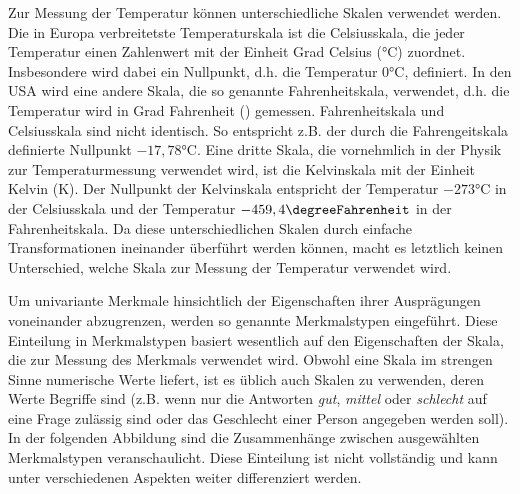 \documentclass{lecture}
\begin{document}
    \begin{example}
        Zur Messung der Temperatur können unterschiedliche Skalen verwendet werden.
        Die in Europa verbreitetste Temperaturskala ist die Celsiusskala, die jeder Temperatur einen Zahlenwert mit der Einheit Grad Celsius (\si{\degreeCelsius}) zuordnet.
        Insbesondere wird dabei ein Nullpunkt, d.h. die Temperatur \(0\si{\degreeCelsius}\), definiert.
        In den USA wird eine andere Skala, die so genannte Fahrenheitskala, verwendet, d.h. die Temperatur wird in Grad Fahrenheit (\si{\degreeFahrenheit}) gemessen.
        Fahrenheitskala und Celsiusskala sind nicht identisch.
        So entspricht z.B. der durch die Fahrengeitskala definierte Nullpunkt \(-17,78\si{\degreeCelsius}\).
        Eine dritte Skala, die vornehmlich in der Physik zur Temperaturmessung verwendet wird, ist die Kelvinskala mit der Einheit Kelvin (\si{\kelvin}).
        Der Nullpunkt der Kelvinskala entspricht der Temperatur \(-273\si{\degreeCelsius}\) in der Celsiusskala und der Temperatur \(-459,4\si{\degreeFahrenheit}\) in der Fahrenheitskala.
        Da diese unterschiedlichen Skalen durch einfache Transformationen ineinander überführt werden können, macht es letztlich keinen Unterschied, welche Skala zur Messung der Temperatur verwendet wird.
    \end{example}

    Um univariante Merkmale hinsichtlich der Eigenschaften ihrer Ausprägungen voneinander abzugrenzen, werden so genannte Merkmalstypen eingeführt.
    Diese Einteilung in Merkmalstypen basiert wesentlich auf den Eigenschaften der Skala, die zur Messung des Merkmals verwendet wird.
    Obwohl eine Skala im strengen Sinne numerische Werte liefert, ist es üblich auch Skalen zu verwenden, deren Werte Begriffe sind (z.B. wenn nur die Antworten \emph{gut}, \emph{mittel} oder \emph{schlecht} auf eine Frage zulässig sind oder das Geschlecht einer Person angegeben werden soll).
    In der folgenden Abbildung sind die Zusammenhänge zwischen ausgewählten Merkmalstypen veranschaulicht.
    Diese Einteilung ist nicht vollständig und kann unter verschiedenen Aspekten weiter differenziert werden.
    \begin{center}
    \end{center}
\end{document}
